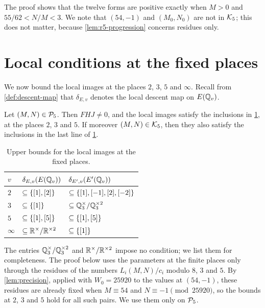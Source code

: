 The proof shows that the twelve forms are positive exactly when $M>0$ and $55/62<N/M<3$. We note that $(54,-1)$ and $(M_0,N_0)$ are not in $\mathcal K_5$; this does not matter, because \cref{lem:r5-progression} concerns residues only.

\section{Local conditions at the fixed places}\label{sec:r5-fixed}

We now bound the local images at the places $2$, $3$, $5$ and $\infty$. Recall from \cref{def:descent-map} that $\delta_{E,v}$ denotes the local descent map on $E(\mathbb Q_v)$.

\begin{lemma}\label{lem:r5-fixed}
Let $(M,N)\in\mathcal P_5$. Then $FHJ\ne0$, and the local images satisfy the inclusions in \cref{tab:r5-fixed}, at the places $2$, $3$ and $5$. If moreover $(M,N)\in\mathcal K_5$, then they also satisfy the inclusions in the last line of \cref{tab:r5-fixed}.
\end{lemma}

\begin{table}[htbp]
\centering
\caption{Upper bounds for the local images at the fixed places.}\label{tab:r5-fixed}
\begin{tabular}{lll}
\toprule
$v$ & $\delta_{E,v}(E(\mathbb Q_v))$ & $\delta_{E',v}(E'(\mathbb Q_v))$\\
\midrule
$2$ & $\subseteq\{[1],[2]\}$ & $\subseteq\{[1],[-1],[2],[-2]\}$\\
$3$ & $\subseteq\{[1]\}$ & $\subseteq\mathbb Q_3^{\times}/\mathbb Q_3^{\times2}$\\
$5$ & $\subseteq\{[1],[5]\}$ & $\subseteq\{[1],[5]\}$\\
$\infty$ & $\subseteq\mathbb R^{\times}/\mathbb R^{\times2}$ & $\subseteq\{[1]\}$\\
\bottomrule
\end{tabular}
\end{table}

The entries $\mathbb Q_3^{\times}/\mathbb Q_3^{\times2}$ and $\mathbb R^{\times}/\mathbb R^{\times2}$ impose no condition; we list them for completeness. The proof below uses the parameters at the finite places only through the residues of the numbers $L_i(M,N)/c_i$ modulo $8$, $3$ and $5$. By \cref{lem:precision}, applied with $W_0=25920$ to the values at $(54,-1)$, these residues are already fixed when $M\equiv54$ and $N\equiv-1\pmod{25920}$, so the bounds at $2$, $3$ and $5$ hold for all such pairs. We use them only on $\mathcal P_5$.

